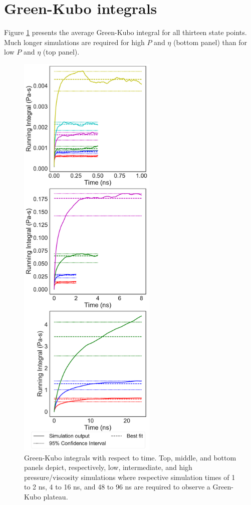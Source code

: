 \documentclass[preprint,review,11pt]{elsarticle}
\begin{document}
\begin{longtable}{|c|c|c|c|c|c|c|c|}
			\end{longtable}
					
	\clearpage
	\newpage
	
	
	\section{Green-Kubo integrals} \label{SI:Running integrals}
		
	Figure \ref{fig:running_integrals} presents the average Green-Kubo integral for all thirteen state points. Much longer simulations are required for high $P$ and $\eta$ (bottom panel) than for low $P$ and $\eta$ (top panel). 	
	
	\begin{figure}[htb!]
		\centering
				\includegraphics[width=2.6in]{GreenKubo_integrals.pdf}
		\caption{Green-Kubo integrals with respect to time. Top, middle, and bottom panels depict, respectively, low, intermediate, and high pressure/viscosity simulations where respective simulation times of 1 to 2 ns, 4 to 16 ns, and 48 to 96 ns are required to observe a Green-Kubo plateau.}
		\label{fig:running_integrals}
	\end{figure}
\end{document}
